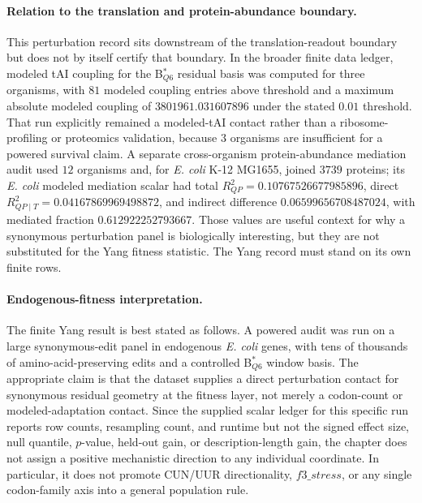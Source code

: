 \paragraph{Relation to the translation and protein-abundance boundary.}
This perturbation record sits downstream of the translation-readout boundary but does not by itself certify that boundary.  In the broader finite data ledger, modeled tAI coupling for the B$^{*}_{Q6}$ residual basis was computed for three organisms, with $81$ modeled coupling entries above threshold and a maximum absolute modeled coupling of $3801961.031607896$ under the stated $0.01$ threshold.  That run explicitly remained a modeled-tAI contact rather than a ribosome-profiling or proteomics validation, because $3$ organisms are insufficient for a powered survival claim.  A separate cross-organism protein-abundance mediation audit used $12$ organisms and, for \textit{E. coli} K-12 MG1655, joined $3739$ proteins; its \textit{E. coli} modeled mediation scalar had total $R^{2}_{QP}=0.10767526677985896$, direct $R^{2}_{QP\mid T}=0.04167869969498872$, and indirect difference $0.06599656708487024$, with mediated fraction $0.612922252793667$.  Those values are useful context for why a synonymous perturbation panel is biologically interesting, but they are not substituted for the Yang fitness statistic.  The Yang record must stand on its own finite rows.

\paragraph{Endogenous-fitness interpretation.}
The finite Yang result is best stated as follows.  A powered audit was run on a large synonymous-edit panel in endogenous \textit{E. coli} genes, with tens of thousands of amino-acid-preserving edits and a controlled B$^{*}_{Q6}$ window basis.  The appropriate claim is that the dataset supplies a direct perturbation contact for synonymous residual geometry at the fitness layer, not merely a codon-count or modeled-adaptation contact.  Since the supplied scalar ledger for this specific run reports row counts, resampling count, and runtime but not the signed effect size, null quantile, $p$-value, held-out gain, or description-length gain, the chapter does not assign a positive mechanistic direction to any individual coordinate.  In particular, it does not promote CUN/UUR directionality, $f3\_stress$, or any single codon-family axis into a general population rule.

